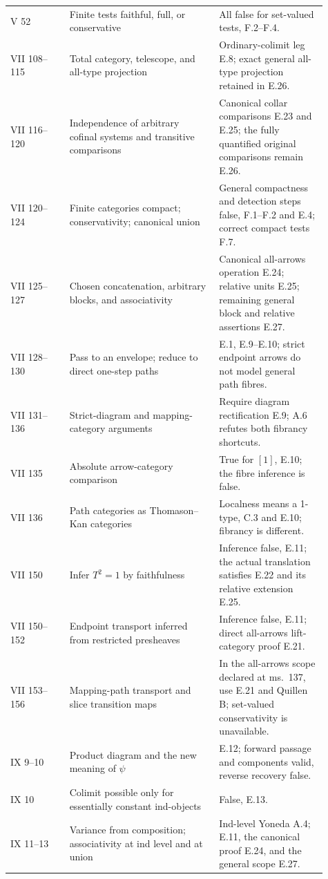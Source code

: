 \begin{center}
\begin{longtable}{L{0.17\linewidth}L{0.43\linewidth}L{0.31\linewidth}}
V 52 & Finite tests faithful, full, or conservative & All false for set-valued tests, F.2--F.4.\\
VII 108--115 & Total category, telescope, and all-type projection & Ordinary-colimit leg E.8; exact general all-type projection retained in E.26.\\
VII 116--120 & Independence of arbitrary cofinal systems and transitive comparisons & Canonical collar comparisons E.23 and E.25; the fully quantified original comparisons remain E.26.\\
VII 120--124 & Finite categories compact; conservativity; canonical union & General compactness and detection steps false, F.1--F.2 and E.4; correct compact tests F.7.\\
VII 125--127 & Chosen concatenation, arbitrary blocks, and associativity & Canonical all-arrows operation E.24; relative units E.25; remaining general block and relative assertions E.27.\\
VII 128--130 & Pass to an envelope; reduce to direct one-step paths & E.1, E.9--E.10; strict endpoint arrows do not model general path fibres.\\
VII 131--136 & Strict-diagram and mapping-category arguments & Require diagram rectification E.9; A.6 refutes both fibrancy shortcuts.\\
VII 135 & Absolute arrow-category comparison & True for $[1]$, E.10; the fibre inference is false.\\
VII 136 & Path categories as Thomason--Kan categories & Localness means a 1-type, C.3 and E.10; fibrancy is different.\\
VII 150 & Infer $T^2=1$ by faithfulness & Inference false, E.11; the actual translation satisfies E.22 and its relative extension E.25.\\
VII 150--152 & Endpoint transport inferred from restricted presheaves & Inference false, E.11; direct all-arrows lift-category proof E.21.\\
VII 153--156 & Mapping-path transport and slice transition maps & In the all-arrows scope declared at ms.~137, use E.21 and Quillen B; set-valued conservativity is unavailable.\\
IX 9--10 & Product diagram and the new meaning of $\psi$ & E.12; forward passage and components valid, reverse recovery false.\\
IX 10 & Colimit possible only for essentially constant ind-objects & False, E.13.\\
IX 11--13 & Variance from composition; associativity at ind level and at union & Ind-level Yoneda A.4; E.11, the canonical proof E.24, and the general scope E.27.\\

\end{longtable}
\end{center}
